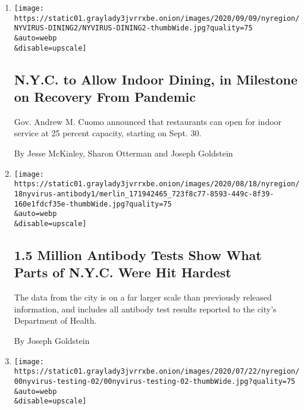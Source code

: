 \begin{enumerate}
\def\labelenumi{\arabic{enumi}.}
\item
  \href{/2020/09/09/nyregion/indoor-dining-coronavirus.html}{}

  \texttt{[image: https://static01.graylady3jvrrxbe.onion/images/2020/09/09/nyregion/NYVIRUS-DINING2/NYVIRUS-DINING2-thumbWide.jpg?quality=75\\\&auto=webp\\\&disable=upscale]}

  \hypertarget{nyc-to-allow-indoor-dining-in-milestone-on-recovery-from-pandemic}{%
  \subsection{N.Y.C. to Allow Indoor Dining, in Milestone on Recovery
  From
  Pandemic}\label{nyc-to-allow-indoor-dining-in-milestone-on-recovery-from-pandemic}}

  Gov. Andrew M. Cuomo announced that restaurants can open for indoor
  service at 25 percent capacity, starting on Sept. 30.

  By Jesse McKinley, Sharon Otterman and Joseph Goldstein
\item
  \href{/2020/08/19/nyregion/new-york-city-antibody-test.html}{}

  \texttt{[image: https://static01.graylady3jvrrxbe.onion/images/2020/08/18/nyregion/18nyvirus-antibody1/merlin\_171942465\_723f8c77-8593-449c-8f39-160e1fdcf35e-thumbWide.jpg?quality=75\\\&auto=webp\\\&disable=upscale]}

  \hypertarget{15-million-antibody-tests-show-what-parts-of-nyc-were-hit-hardest}{%
  \subsection{1.5 Million Antibody Tests Show What Parts of N.Y.C. Were
  Hit
  Hardest}\label{15-million-antibody-tests-show-what-parts-of-nyc-were-hit-hardest}}

  The data from the city is on a far larger scale than previously
  released information, and includes all antibody test results reported
  to the city's Department of Health.

  By Joseph Goldstein
\item
  \href{/2020/07/23/nyregion/coronavirus-testing-nyc.html}{}

  \texttt{[image: https://static01.graylady3jvrrxbe.onion/images/2020/07/22/nyregion/00nyvirus-testing-02/00nyvirus-testing-02-thumbWide.jpg?quality=75\\\&auto=webp\\\&disable=upscale]}

  \hypertarget{testing-bottlenecks-threaten-nycs-ability-to-contain-virus}{%
}
\end{enumerate}
